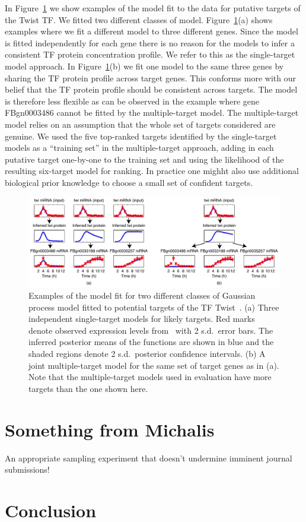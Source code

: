 \documentclass{article}
\begin{document}
In Figure~\ref{fig:gpdisim_models} we show examples of the model fit to
the data for putative targets of the Twist TF. We fitted two different
classes of model. Figure~\ref{fig:gpdisim_models}(a) shows examples
where we fit a different model to three different genes. Since the
model is fitted independently for each gene there is no reason for
the models to infer a consistent TF protein concentration profile. We
refer to this as the single-target model approach. In
Figure~\ref{fig:gpdisim_models}(b) we fit one model to the same three
genes by sharing the TF protein profile across target genes. This
conforms more with our belief that the TF protein profile should be
consistent across targets. The model is therefore less flexible as can
be observed in the example where gene FBgn0003486 cannot be fitted by
the multiple-target model. The multiple-target model relies on an assumption
that the whole set of targets considered are genuine. We used the five
top-ranked targets identified by the single-target models as a ``training set'' in the
multiple-target approach, adding in each putative target one-by-one to
the training set and using the likelihood of the resulting six-target model for
ranking. In practice one mighht also use additional biological prior knowledge
to choose a small set of confident targets. 

\begin{figure}[tb]
  \centering
  \includegraphics[width=12cm]{../disim_pnas/fig1}
  \caption{Examples of the model fit for two different classes of 
    Gaussian process model fitted to potential targets of the TF Twist~\citep[from][]{Honkela:modelbased10}. (a) Three independent single-target models
    for likely targets. Red marks denote observed expression
    levels from~\cite{Tomancak2002} with 2 s.d.\ error bars.
    The inferred posterior means of the functions are shown in blue
    and the shaded regions denote 2 s.d.\ posterior confidence
    intervals. (b) A joint multiple-target model for
    the same set of target genes as in (a). Note that
    the multiple-target models used in evaluation have more targets
    than the one shown here.\label{fig:gpdisim_models}
}
\end{figure}


\section{Something from Michalis}

An appropriate sampling experiment that doesn't undermine imminent journal submissions!

\section{Conclusion}


  
\end{document}
